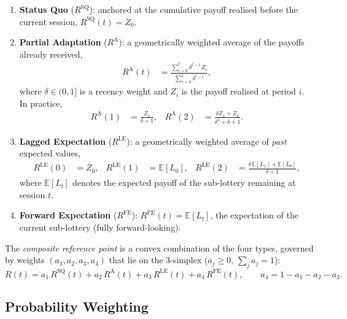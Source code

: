 \documentclass[12pt, a4paper]{article}
\newcommand{\E}{\mathbb{E}}
\begin{document}
\begin{enumerate}[label=\arabic*.]
  \item \textbf{Status Quo} ($R^{\mathrm{SQ}}$): anchored at the cumulative
  payoff realised before the current session,
  $R^{\mathrm{SQ}}(t) = Z_0$.

  \item \textbf{Partial Adaptation} ($R^{\mathrm{A}}$): a geometrically
  weighted average of the payoffs already received,
  \begin{align}
    R^{\mathrm{A}}(t) &= \frac{\sum_{i=0}^{t} \delta^{t-i}\,Z_i}
                               {\sum_{i=0}^{t} \delta^{t-i}},
  \end{align}
  where $\delta \in (0,1]$ is a recency weight and $Z_i$ is the payoff
  realised at period $i$.  In practice,
  \begin{align}
    R^{\mathrm{A}}(1) &= \frac{Z_1}{\delta + 1}, &
    R^{\mathrm{A}}(2) &= \frac{\delta Z_1 + Z_2}{\delta^2 + \delta + 1}.
  \end{align}

  \item \textbf{Lagged Expectation} ($R^{\mathrm{LE}}$): a geometrically
  weighted average of \emph{past} expected values,
  \begin{align}
    R^{\mathrm{LE}}(0) &= Z_0, &
    R^{\mathrm{LE}}(1) &= \E[L_0], &
    R^{\mathrm{LE}}(2) &= \frac{\delta\,\E[L_1] + \E[L_0]}{\delta + 1},
  \end{align}
  where $\E[L_t]$ denotes the expected payoff of the sub-lottery remaining at
  session $t$.

  \item \textbf{Forward Expectation} ($R^{\mathrm{FE}}$):
  $R^{\mathrm{FE}}(t) = \E[L_t]$, the expectation of the current
  sub-lottery (fully forward-looking).
\end{enumerate}

The \emph{composite reference point} is a convex combination of the four types,
governed by weights $(a_1, a_2, a_3, a_4)$ that lie on the 3-simplex
($a_j \geq 0$, $\sum_j a_j = 1$):
\begin{equation}
  R(t) = a_1\,R^{\mathrm{SQ}}(t) + a_2\,R^{\mathrm{A}}(t)
        + a_3\,R^{\mathrm{LE}}(t) + a_4\,R^{\mathrm{FE}}(t),
  \qquad a_4 = 1 - a_1 - a_2 - a_3.
  \label{eq:composite_R}
\end{equation}

\subsection{Probability Weighting}
\label{sec:pw}
\end{document}
